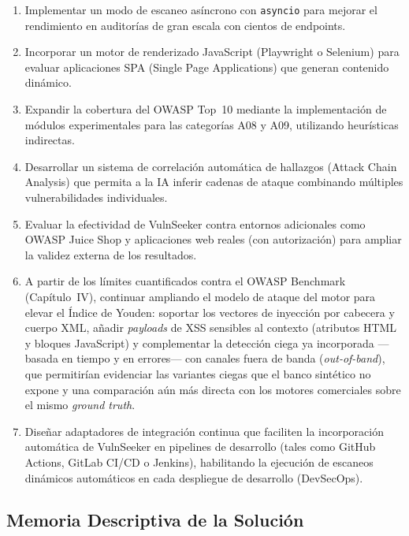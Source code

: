 \documentclass[12pt, a4paper]{article}
\begin{document}
\begin{enumerate}
    \item Implementar un modo de escaneo asíncrono con \texttt{asyncio} para
    mejorar el rendimiento en auditorías de gran escala con cientos de
    endpoints.

    \item Incorporar un motor de renderizado JavaScript (Playwright o
    Selenium) para evaluar aplicaciones SPA (Single Page Applications)
    que generan contenido dinámico.

    \item Expandir la cobertura del OWASP Top~10 mediante la implementación
    de módulos experimentales para las categorías A08 y A09, utilizando
    heurísticas indirectas.

    \item Desarrollar un sistema de correlación automática de hallazgos
    (Attack Chain Analysis) que permita a la IA inferir cadenas de ataque
    combinando múltiples vulnerabilidades individuales.

    \item Evaluar la efectividad de VulnSeeker contra entornos adicionales
    como OWASP Juice Shop y aplicaciones web reales (con autorización) para
    ampliar la validez externa de los resultados.

    \item A partir de los límites cuantificados contra el OWASP Benchmark
    (Capítulo~IV), continuar ampliando el modelo de ataque del motor para elevar el
    Índice de Youden: soportar los vectores de inyección por cabecera y cuerpo XML,
    añadir \textit{payloads} de XSS sensibles al contexto (atributos HTML y bloques
    JavaScript) y complementar la detección ciega ya incorporada ---basada en tiempo
    y en errores--- con canales fuera de banda (\textit{out-of-band}), que
    permitirían evidenciar las variantes ciegas que el banco sintético no expone y
    una comparación aún más directa con los motores comerciales sobre el mismo
    \textit{ground truth}.

    \item Diseñar adaptadores de integración continua que faciliten la
    incorporación automática de VulnSeeker en pipelines de desarrollo (tales
    como GitHub Actions, GitLab CI/CD o Jenkins), habilitando la ejecución
    de escaneos dinámicos automáticos en cada despliegue de desarrollo
    (DevSecOps).
\end{enumerate}


\subsection{Memoria Descriptiva de la Solución}
\end{document}
